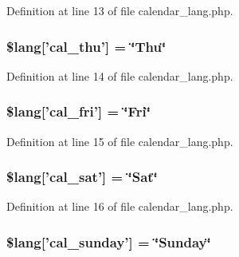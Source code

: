 Definition at line 13 of file calendar\-\_\-lang.\-php.

\hypertarget{calendar__lang_8php_af49921f5f0bcc54c07efed2cf4b71e01}{
\subsubsection[{\$lang}]{\setlength{\rightskip}{0pt plus 5cm}\$lang\mbox{[}'cal\-\_\-thu'\mbox{]} = \char`\"{}Thu\char`\"{}}}\label{calendar__lang_8php_af49921f5f0bcc54c07efed2cf4b71e01}


Definition at line 14 of file calendar\-\_\-lang.\-php.

\hypertarget{calendar__lang_8php_abfe2cd9d203b296392f657caf8488b53}{
\subsubsection[{\$lang}]{\setlength{\rightskip}{0pt plus 5cm}\$lang\mbox{[}'cal\-\_\-fri'\mbox{]} = \char`\"{}Fri\char`\"{}}}\label{calendar__lang_8php_abfe2cd9d203b296392f657caf8488b53}


Definition at line 15 of file calendar\-\_\-lang.\-php.

\hypertarget{calendar__lang_8php_aa1dc0204b4066fa35b0760e1437e8194}{
\subsubsection[{\$lang}]{\setlength{\rightskip}{0pt plus 5cm}\$lang\mbox{[}'cal\-\_\-sat'\mbox{]} = \char`\"{}Sat\char`\"{}}}\label{calendar__lang_8php_aa1dc0204b4066fa35b0760e1437e8194}


Definition at line 16 of file calendar\-\_\-lang.\-php.

\hypertarget{calendar__lang_8php_ade346ced9dfd91f19b1912bda55ed6b9}{
\subsubsection[{\$lang}]{\setlength{\rightskip}{0pt plus 5cm}\$lang\mbox{[}'cal\-\_\-sunday'\mbox{]} = \char`\"{}Sunday\char`\"{}}}\label{calendar__lang_8php_ade346ced9dfd91f19b1912bda55ed6b9}


